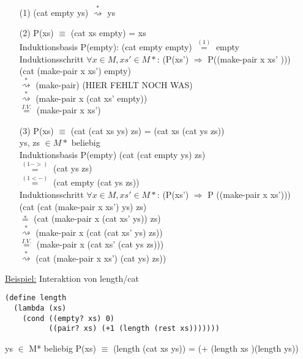 \documentclass[a4paper,12pt]{article}
\begin{document}
\begin{itemize}
\item[(1)] (cat empty ys) $\overset{*}{\rightsquigarrow}$ ys \checkmark \\
\item[(2)] P(xs) $\equiv$ (cat xs empty) = xs\\

Induktionsbasis P(empty): (cat empty empty) $\overset{(1)}{=}$ empty \checkmark\\
Induktionsschritt $\forall x \in M, xs' \in M*$: (P(xs') $\Rightarrow$ P((make-pair x xs' )))\\
(cat (make-pair x xs') empty)\\
$\overset{*}{\rightsquigarrow}$ (make-pair)   (HIER FEHLT NOCH WAS)\\ %
$\overset{*}{\rightsquigarrow}$ (make-pair x (cat xs' empty))\\
$\overset{I.V.}{=}$ (make-pair x xs') \\
\item[(3)] P(xs) $\equiv$ (cat (cat xs ys) zs) = (cat xs (cat ys zs))\\
ys, zs $\in M*$ beliebig\\

Induktionsbasis P(empty)
(cat (cat empty ys) zs) \\
$\overset{(1->)}{=}$ (cat ys zs)\\
$\overset{(1<-)}{=}$ (cat empty (cat ys zs)) \checkmark\\

Induktionsschritt $\forall x \in M, xs' \in M*$: (P(xs') $\Rightarrow$ P ((make-pair x xs'))) \\
(cat (cat (make-pair x xs') ys) zs)\\
$\overset{*}{=}$ (cat (make-pair x (cat xs' ys)) zs)\\
$\overset{*}{\rightsquigarrow}$ (make-pair x (cat (cat xs' ys) zs))\\
$\overset{I.V.}{=}$ (make-pair x (cat xs' (cat ys zs)))\\ 
$\overset{*}{\rightsquigarrow}$ (cat (make-pair x xs') (cat ys) zs)) \checkmark \\
\end{itemize}
\uline{Beispiel:} Interaktion von length/cat
\begin{lstlisting}[style=customc]
(define length
  (lambda (xs)
    (cond ((empty? xs) 0)
          ((pair? xs) (+1 (length (rest xs)))))))
\end{lstlisting}
ys $\in$ M* beliebig
P(xs) $\equiv$ (length (cat xs ys)) = (+ (length xs )(length ys))
\end{document}
